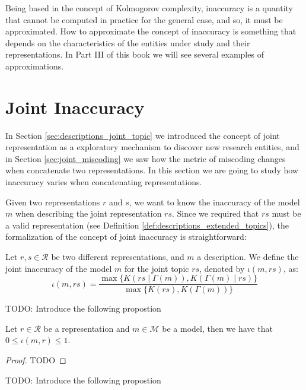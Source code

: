 Being based in the concept of Kolmogorov complexity, inaccuracy is a quantity that cannot be computed in practice for the general case, and so, it must be approximated. How to approximate the concept of inaccuracy is something that depends on the characteristics of the entities under study and their representations. In Part III of this book we will see several examples of approximations.

%
%

\section{Joint Inaccuracy}

In Section \ref{sec:descriptions_joint_topic} we introduced the concept of joint representation as a exploratory mechanism to discover new research entities, and in Section \ref{sec:joint_miscoding} we saw how the metric of miscoding changes when concatenate two representations. In this section we are going to study how inaccuracy varies when concatenating representations.

Given two representations $r$ and $s$, we want to know the inaccuracy of the model $m$ when describing the joint representation $rs$. Since we required that $rs$ must be a valid representation (see Definition \ref{def:descriptions_extended_topics}), the formalization of the concept of joint inaccuracy is straightforward:

\begin{definition}
\label{def:inaccuracy_joint_representation}
Let $r, s \in \mathcal{R}$ be two different representations, and $m$ a description. We define the joint inaccuracy of the model $m$ for the joint topic $rs$, denoted by $\iota(m, rs)$, as:
\[
\iota(m, rs) = \frac{ \max\{ K \left(rs \mid \Gamma(m) \right), K \left( \Gamma(m) \mid rs \right) \} } { \max\{ K(rs), K \left(\Gamma(m) \right) \} }
\]
\end{definition}

{\color{red} TODO: Introduce the following propostion}

\begin{proposition}
Let $r \in \mathcal{R}$ be a representation and $m \in \mathcal{M}$ be a model, then we have that $0 \leq \iota(m, r) \leq 1$.
\end{proposition}
\begin{proof}
{\color{red} TODO}
\end{proof}

{\color{red} TODO: Introduce the following propostion}

